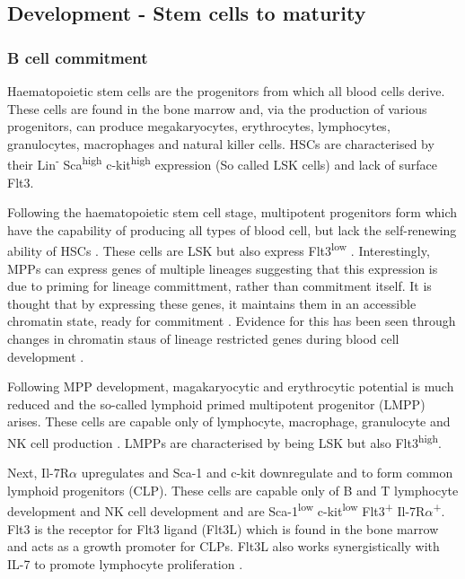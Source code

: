 \subsection{Development - Stem cells to maturity}
\label{subsec:Bcelldevelopment}
\subsubsection{B cell commitment}

Haematopoietic stem cells are the progenitors from which all blood cells derive.
These cells are found in the bone marrow and, via the production of various progenitors, can produce megakaryocytes, erythrocytes, lymphocytes, granulocytes, macrophages and natural killer cells.
HSCs are characterised by their Lin\textsuperscript{-} Sca\textsuperscript{high} c-kit\textsuperscript{high} expression (So called LSK cells) and lack of surface Flt3\citep{Welinder2011}.

Following the haematopoietic stem cell stage, multipotent progenitors form which have the capability of producing all types of blood cell, but lack the self-renewing ability of HSCs .
These cells are LSK but also express Flt3\textsuperscript{low} \citep{Welinder2011}.
Interestingly, MPPs can express genes of multiple lineages \citep{Hu1997} suggesting that this expression is due to priming for lineage committment, rather than commitment itself.
It is thought that by expressing these genes, it maintains them in an accessible chromatin state, ready for commitment \citep{Welinder2011}.
Evidence for this has been seen through changes in chromatin staus of lineage restricted genes during blood cell development \citep{Weishaupt2010}.

Following MPP development, magakaryocytic and erythrocytic potential is much reduced and the so-called lymphoid primed multipotent progenitor (LMPP) arises.
These cells are capable only of lymphocyte, macrophage, granulocyte and NK cell production \citep{Adolfsson2005}.
LMPPs are characterised by being LSK but also Flt3\textsuperscript{high}.

Next, Il-7R$\alpha$ upregulates and Sca-1 and c-kit downregulate and to form common lymphoid progenitors (CLP).
These cells are capable only of B and T lymphocyte development and NK cell development \citep{Kondo1997} and are Sca-1\textsuperscript{low} c-kit\textsuperscript{low} Flt3\textsuperscript{+} Il-7R$\alpha$\textsuperscript{+}.
Flt3 is the receptor for Flt3 ligand (Flt3L) which is found in the bone marrow and acts as a growth promoter for CLPs.
Flt3L also works synergistically with IL-7 to promote lymphocyte proliferation \citep{Holmes2006}.


